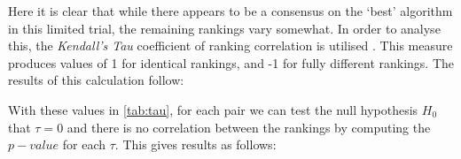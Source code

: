 \documentclass[../main.tex]{subfiles}
\begin{document}
Here it is clear that while there appears to be a consensus on the `best' algorithm in this limited trial, the remaining rankings vary somewhat. In order to analyse this, the \emph{Kendall's Tau} coefficient of ranking correlation is utilised \cite{KENDALL1938}. This measure produces values of 1 for identical rankings, and -1 for fully different rankings. The results of this calculation follow:

\begin{table}[h]
\centering
{}
\caption{Calculated Kendall's Tau values between pairs of rankings}
\label{tab:tau}
\end{table}

With these values in \autoref{tab:tau}, for each pair we can test the null hypothesis $H_0$ that $\tau = 0$ and there is no correlation between the rankings by computing the $p-value$ for each $\tau$. This gives results as follows:
\end{document}
